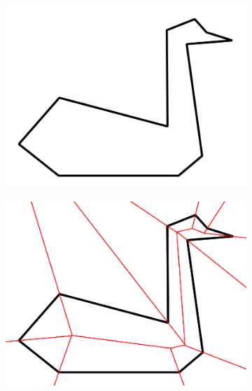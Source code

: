 \documentclass[11pt]{article}
\begin{document}
\begin{figure}[H]
\centering
  \begin{subfigure}[b]{0.18\textwidth}
    \includegraphics[width=\textwidth]{FIGS/Part4/c10}
     \caption{}
    \label{fig:c10}
  \end{subfigure}
  \begin{subfigure}[b]{0.18\textwidth}
    \includegraphics[width=\textwidth]{FIGS/Part4/c11}
     \caption{}
     \label{fig:c11}
  \end{subfigure}
    \begin{subfigure}[b]{0.18\textwidth}

\end{subfigure}
\end{figure}
\end{document}
